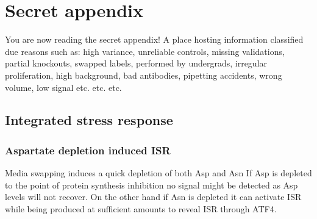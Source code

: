 \chapter{Secret appendix}
You are now reading the secret appendix!
A place hosting information classified due reasons such as: high variance, unreliable controls, missing validations, partial knockouts, swapped labels, performed by undergrads, irregular proliferation, high background, bad antibodies, pipetting accidents, wrong volume, low signal etc. etc. etc.



\section{Integrated stress response}

\subsection{Aspartate depletion induced ISR}

Media swapping induces a quick depletion of both Asp and Asn
If Asp is depleted to the point of protein synthesis inhibition no signal might be detected as Asp levels will not recover.
On the other hand if Asn is depleted it can activate ISR while being produced at sufficient amounts to reveal ISR through ATF4.


